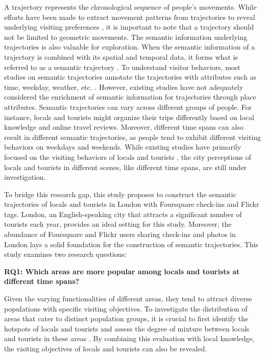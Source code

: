 \documentclass{article}
\theoremstyle{remark}
\begin{document}
A trajectory represents the chronological sequence of people’s movements. While efforts have been made to extract movement patterns from trajectories to reveal underlying visiting preferences \citep{vu_discovering_2019}, it is important to note that a trajectory should not be limited to geometric movements. The semantic information underlying trajectories is also valuable for exploration. When the semantic information of a trajectory is combined with its spatial and temporal data, it forms what is referred to as a semantic trajectory \citep{yan_semantic_2011}. To understand visitor behaviors, most studies on semantic trajectories annotate the trajectories with attributes such as time, weekday, weather, etc. \citep{cai_mining_2018,petry_towards_2019}. However, existing studies have not adequately considered the enrichment of semantic information for trajectories through place attributes. Semantic trajectories can vary across different groups of people. For instance, locals and tourists might organize their trips differently based on local knowledge and online travel reviews. Moreover, different time spans can also result in different semantic trajectories, as people tend to exhibit different visiting behaviors on weekdays and weekends. While existing studies have primarily focused on the visiting behaviors of locals and tourists \citep{domenech_using_2020,straumann_towards_2014}, the city perceptions of locals and tourists in different scenes, like different time spans, are still under investigation.

To bridge this research gap, this study proposes to construct the semantic trajectories of locals and tourists in London with Foursquare check-ins and Flickr tags. London, an English-speaking city that attracts a significant number of tourists each year, provides an ideal setting for this study. Moreover, the abundance of Foursquare and Flickr users sharing check-ins and photos in London lays a solid foundation for the construction of semantic trajectories. This study examines two research questions:

\textbf{RQ1: Which areas are more popular among locals and tourists at different time spans?}

Given the varying functionalities of different areas, they tend to attract diverse populations with specific visiting objectives. To investigate the distribution of areas that cater to distinct population groups, it is crucial to first identify the hotspots of locals and tourists and assess the degree of mixture between locals and tourists in these areas \citep{li_analyzing_2018}. By combining this evaluation with local knowledge, the visiting objectives of locals and tourists can also be revealed.
\end{document}
